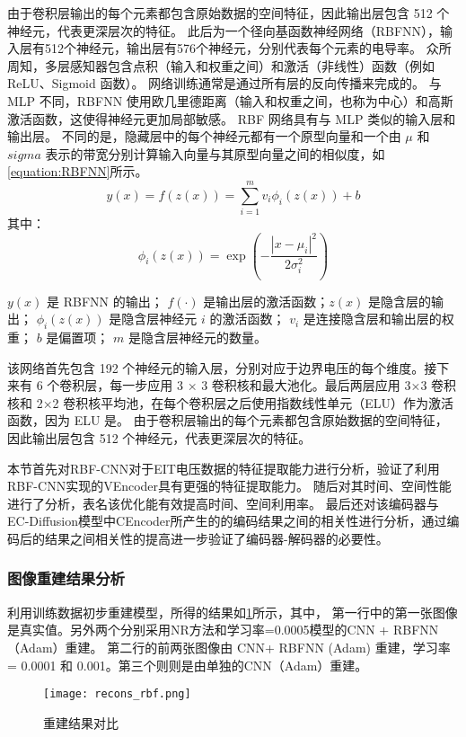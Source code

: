 由于卷积层输出的每个元素都包含原始数据的空间特征，因此输出层包含 512 个神经元，代表更深层次的特征。
此后为一个径向基函数神经网络（RBFNN），输入层有512个神经元，输出层有576个神经元，分别代表每个元素的电导率。
众所周知，多层感知器包含点积（输入和权重之间）和激活（非线性）函数（例如 ReLU、Sigmoid 函数）。
网络训练通常是通过所有层的反向传播来完成的。
与 MLP 不同，RBFNN 使用欧几里德距离（输入和权重之间，也称为中心）和高斯激活函数，这使得神经元更加局部敏感。 
RBF 网络具有与 MLP 类似的输入层和输出层。
不同的是，隐藏层中的每个神经元都有一个原型向量和一个由 $\mu$ 和 $sigma$ 表示的带宽分别计算输入向量与其原型向量之间的相似度，如\cref{equation:RBFNN}所示。
\begin{equation}
    \label{equation:RBFNN}
    y(x) = f(z(x)) = \sum_{i=1}^{m} v_i \phi_i(z(x)) + b
\end{equation}
其中：
\begin{equation}
    \phi_i(z(x)) = \exp\left(-\frac{|x - \mu_i|^2}{2\sigma_i^2}\right)
\end{equation}

$y(x)$ 是 RBFNN 的输出；
$f(\cdot)$ 是输出层的激活函数；$z(x)$ 是隐含层的输出；
$\phi_i(z(x))$ 是隐含层神经元 $i$ 的激活函数；
$v_i$ 是连接隐含层和输出层的权重；
$b$ 是偏置项；
$m$ 是隐含层神经元的数量。

该网络首先包含 192 个神经元的输入层，分别对应于边界电压的每个维度。接下来有 6 个卷积层，每一步应用 3 × 3 卷积核和最大池化。最后两层应用 3×3 卷积核和 2×2 卷积核平均池，在每个卷积层之后使用指数线性单元（ELU）作为激活函数，因为 ELU 是。
由于卷积层输出的每个元素都包含原始数据的空间特征，因此输出层包含 512 个神经元，代表更深层次的特征。


本节首先对RBF-CNN对于EIT电压数据的特征提取能力进行分析，验证了利用RBF-CNN实现的VEncoder具有更强的特征提取能力。
随后对其时间、空间性能进行了分析，表名该优化能有效提高时间、空间利用率。
最后还对该编码器与EC-Diffusion模型中CEncoder所产生的的编码结果之间的相关性进行分析，通过编码后的结果之间相关性的提高进一步验证了编码器-解码器的必要性。
\subsubsection{图像重建结果分析}
利用训练数据初步重建模型，所得的结果如\cref{figure:recons_rbf}所示，其中，
第一行中的第一张图像是真实值。另外两个分别采用NR方法和学习率=0.0005模型的CNN + RBFNN（Adam）重建。
第二行的前两张图像由 CNN+ RBFNN (Adam) 重建，学习率 = 0.0001 和 0.001。第三个则则是由单独的CNN（Adam）重建。
\begin{figure}[h]
    \centering
    
    \texttt{[image: recons\_rbf.png]}
    
    \caption{重建结果对比}
    \label{figure:recons_rbf}
\end{figure}

